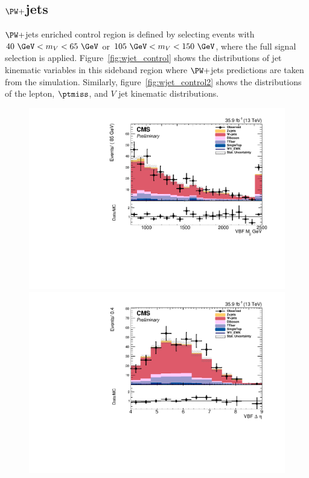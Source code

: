 \subsection{$\PW+$jets}
$\PW+$jets enriched control region is defined by selecting events with $40~\GeV < m_{V} < 65~\GeV$ or $105~\GeV < m_{V} < 150~\GeV$, where the full signal selection is applied. Figure~\ref{fig:wjet_control} shows the distributions of jet kinematic variables in this sideband region where $\PW+$jets predictions are taken from the simulation. Similarly, figure~\ref{fig:wjet_control2} shows the distributions of the lepton, $\ptmiss$, and $V$ jet kinematic distributions. 

\begin{figure}[htb]
\centering
\includegraphics[width=\cmsFigWidth]{Plots/plots/DibosonBoostedElMuCuts13TeV_WjetControlRegion_Tighter_CHS_vbf_maxpt_jj_m.pdf}
\includegraphics[width=\cmsFigWidth]{Plots/plots/DibosonBoostedElMuCuts13TeV_WjetControlRegion_Tighter_CHS_vbf_maxpt_jj_Deta.pdf}

\end{figure}

